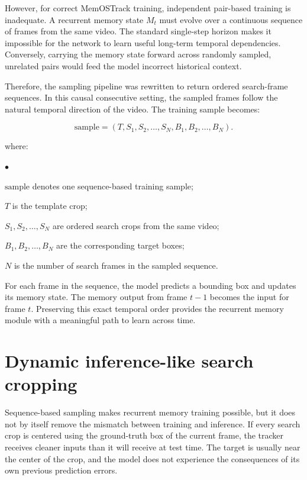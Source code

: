 \documentclass[bachelorthesis]{fer}
\numberwithin{equation}{chapter}
\newcommand{\FormulaNotationWith}[2]{%
    \vspace{-0.6em}
    \noindent\hspace*{1.2em}%
    \begin{minipage}{0.90\textwidth}
        \footnotesize
        #1
        \vspace{0.2em}
        \begin{list}{\(\bullet\)}{
            \setlength{\leftmargin}{1.4em}
            \setlength{\labelwidth}{0.8em}
            \setlength{\labelsep}{0.5em}
            \setlength{\itemsep}{0.05em}
            \setlength{\parsep}{0pt}
            \setlength{\topsep}{0.25em}
            \setlength{\partopsep}{0pt}
        }
            #2
        \end{list}
    \end{minipage}
    \par
    \vspace{0.8em}

}
\newcommand{\FormulaNotation}[1]{\FormulaNotationWith{where:}{#1}}
\begin{document}
    However, for correct MemOSTrack training, independent pair-based training is inadequate. A recurrent memory state \(M_t\) must evolve over a continuous sequence of frames from the same video. The standard single-step horizon makes it impossible for the network to learn useful long-term temporal dependencies. Conversely, carrying the memory state forward across randomly sampled, unrelated pairs would feed the model incorrect historical context.

    Therefore, the sampling pipeline was rewritten to return ordered search-frame sequences. In this
    causal consecutive setting, the sampled frames follow the natural temporal direction of the video. The training sample becomes:

    \begin{equation}
        \text{sample} = (T, S_1, S_2, \dots, S_N, B_1, B_2, \dots, B_N).
    \end{equation}
    \FormulaNotation{
        \item \(\text{sample}\) denotes one sequence-based training sample;
        \item \(T\) is the template crop;
        \item \(S_1, S_2, \dots, S_N\) are ordered search crops from the same video;
        \item \(B_1, B_2, \dots, B_N\) are the corresponding target boxes;
        \item \(N\) is the number of search frames in the sampled sequence.
    }

    For each frame in the sequence, the model predicts a bounding box and updates its memory state. The memory output from frame \(t-1\) becomes the input for frame \(t\). Preserving this exact temporal order provides the recurrent memory module with a meaningful path to learn across time.


    \section{Dynamic inference-like search cropping}\label{dynamic-search-cropping}

    Sequence-based sampling makes recurrent memory training possible, but it does not by
    itself remove the mismatch between training and inference. If every search crop is
    centered using the ground-truth box of the current frame, the tracker receives cleaner
    inputs than it will receive at test time. The target is usually near the center of the
    crop, and the model does not experience the consequences of its own previous prediction
    errors.
\end{document}
